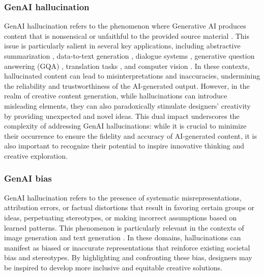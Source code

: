 \subsubsection{GenAI hallucination} 
GenAI hallucination refers to the phenomenon where Generative AI produces content that is nonsensical or unfaithful to the provided source material \cite{ji2023survey}. This issue is particularly salient in several key applications, including abstractive summarization \cite{pagnoni2021understanding}, data-to-text generation \cite{wiseman2017challenges}, dialogue systems \cite{li2020slot, santhanam2021rome}, generative question answering (GQA) \cite{nguyen2016ms}, translation tasks \cite{zhou2020detecting}, and computer vision \cite{zhou2023analyzing}. In these contexts, hallucinated content can lead to misinterpretations and inaccuracies, undermining the reliability and trustworthiness of the AI-generated output. However, in the realm of creative content generation, while hallucinations can introduce misleading elements, they can also paradoxically stimulate designers' creativity by providing unexpected and novel ideas. This dual impact underscores the complexity of addressing GenAI hallucinations: while it is crucial to minimize their occurrence to ensure the fidelity and accuracy of AI-generated content, it is also important to recognize their potential to inspire innovative thinking and creative exploration.


\subsubsection{GenAI bias}
GenAI hallucination refers to the presence of systematic misrepresentations, attribution errors, or factual distortions that result in favoring certain groups or ideas, perpetuating stereotypes, or making incorrect assumptions based on learned patterns. This phenomenon is particularly relevant in the contexts of image generation \cite{zhou2024bias} and text generation \cite{ferrara2023should}. In these domains, hallucinations can manifest as biased or inaccurate representations that reinforce existing societal bias and stereotypes. By highlighting and confronting these bias, designers may be inspired to develop more inclusive and equitable creative solutions.


